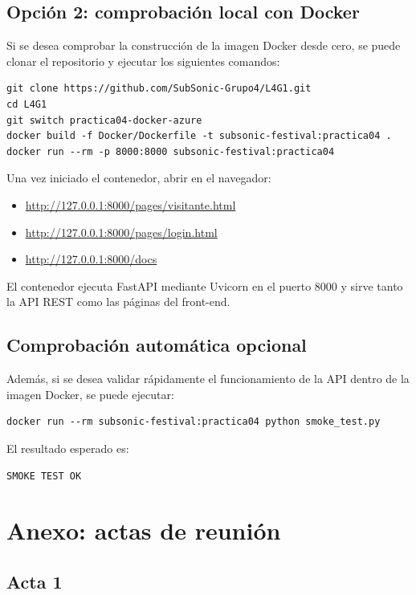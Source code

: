 \documentclass[11pt,a4paper]{article}
\begin{document}
\subsection{Opci\'on 2: comprobaci\'on local con Docker}

Si se desea comprobar la construcci\'on de la imagen Docker desde cero, se puede clonar el repositorio y ejecutar los siguientes comandos:

\begin{verbatim}
git clone https://github.com/SubSonic-Grupo4/L4G1.git
cd L4G1
git switch practica04-docker-azure
docker build -f Docker/Dockerfile -t subsonic-festival:practica04 .
docker run --rm -p 8000:8000 subsonic-festival:practica04
\end{verbatim}

Una vez iniciado el contenedor, abrir en el navegador:

\begin{itemize}
  \item \url{http://127.0.0.1:8000/pages/visitante.html}
  \item \url{http://127.0.0.1:8000/pages/login.html}
  \item \url{http://127.0.0.1:8000/docs}
\end{itemize}

El contenedor ejecuta FastAPI mediante Uvicorn en el puerto 8000 y sirve tanto la API REST como las p\'aginas del front-end.

\subsection{Comprobaci\'on autom\'atica opcional}

Adem\'as, si se desea validar r\'apidamente el funcionamiento de la API dentro de la imagen Docker, se puede ejecutar:

\begin{verbatim}
docker run --rm subsonic-festival:practica04 python smoke_test.py
\end{verbatim}

El resultado esperado es:

\begin{verbatim}
SMOKE TEST OK
\end{verbatim}

\section{Anexo: actas de reuni\'on}

\subsection*{Acta 1}
\end{document}
